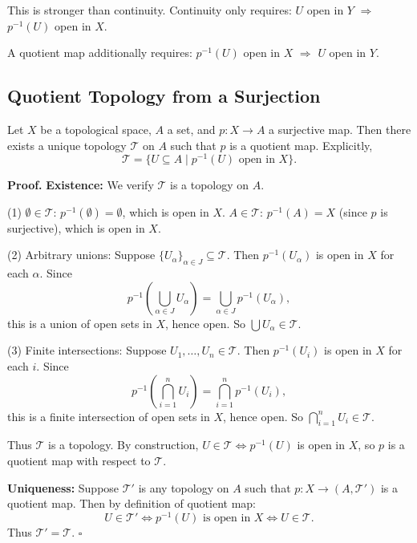 \documentclass[11pt]{report}
\renewenvironment{proof}[1][Proof]{\noindent\textbf{#1.} }{\hfill$\square$\par\vspace{5pt}}
\begin{document}
\begin{rembox}
This is stronger than continuity. Continuity only requires: $U$ open in $Y$ $\Rightarrow$ $p^{-1}(U)$ open in $X$.

A quotient map additionally requires: $p^{-1}(U)$ open in $X$ $\Rightarrow$ $U$ open in $Y$.
\end{rembox}

\subsection{Quotient Topology from a Surjection}

\begin{propbox}
Let $X$ be a topological space, $A$ a set, and $p: X \to A$ a surjective map. Then there exists a unique topology $\mathcal{T}$ on $A$ such that $p$ is a quotient map. Explicitly,
\[\mathcal{T} = \{U \subseteq A \mid p^{-1}(U) \text{ open in } X\}.\]
\end{propbox}

\begin{proof}
\textbf{Existence:} We verify $\mathcal{T}$ is a topology on $A$.

(1) $\emptyset \in \mathcal{T}$: $p^{-1}(\emptyset) = \emptyset$, which is open in $X$. $A \in \mathcal{T}$: $p^{-1}(A) = X$ (since $p$ is surjective), which is open in $X$.

(2) Arbitrary unions: Suppose $\{U_\alpha\}_{\alpha \in J} \subseteq \mathcal{T}$. Then $p^{-1}(U_\alpha)$ is open in $X$ for each $\alpha$. Since
\[p^{-1}\!\left(\bigcup_{\alpha \in J} U_\alpha\right) = \bigcup_{\alpha \in J} p^{-1}(U_\alpha),\]
this is a union of open sets in $X$, hence open. So $\bigcup U_\alpha \in \mathcal{T}$.

(3) Finite intersections: Suppose $U_1, \ldots, U_n \in \mathcal{T}$. Then $p^{-1}(U_i)$ is open in $X$ for each $i$. Since
\[p^{-1}\!\left(\bigcap_{i=1}^n U_i\right) = \bigcap_{i=1}^n p^{-1}(U_i),\]
this is a finite intersection of open sets in $X$, hence open. So $\bigcap_{i=1}^n U_i \in \mathcal{T}$.

Thus $\mathcal{T}$ is a topology. By construction, $U \in \mathcal{T} \Leftrightarrow p^{-1}(U)$ is open in $X$, so $p$ is a quotient map with respect to $\mathcal{T}$.

\textbf{Uniqueness:} Suppose $\mathcal{T}'$ is any topology on $A$ such that $p: X \to (A, \mathcal{T}')$ is a quotient map. Then by definition of quotient map:
\[U \in \mathcal{T}' \iff p^{-1}(U) \text{ is open in } X \iff U \in \mathcal{T}.\]
Thus $\mathcal{T}' = \mathcal{T}$.
\end{proof}
\end{document}

